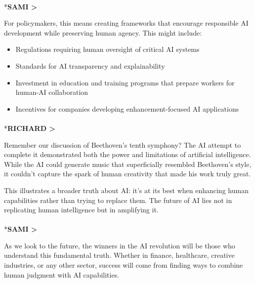 \documentclass[
  Letterpaper,
]{scrbook}
\makeatletter
\let\oldparagraph\paragraph
\renewcommand{\paragraph}{
    \@ifstar
      \xxxParagraphStar
      \xxxParagraphNoStar
  }
\newcommand{\xxxParagraphStar}[1]{\oldparagraph*{#1}\mbox{}}
\newcommand{\xxxParagraphNoStar}[1]{\oldparagraph{#1}\mbox{}}
\providecommand{\tightlist}{%
  \setlength{\itemsep}{0pt}\setlength{\parskip}{0pt}}\usepackage{longtable,booktabs,array}
\makeatother
\begin{document}
\paragraph*{\texorpdfstring{\textbf{SAMI
\textgreater{}}}{SAMI \textgreater{}}}\label{sami-2}

For policymakers, this means creating frameworks that encourage
responsible AI development while preserving human agency. This might
include:

\begin{itemize}
\tightlist
\item
  Regulations requiring human oversight of critical AI systems
\item
  Standards for AI transparency and explainability
\item
  Investment in education and training programs that prepare workers for
  human-AI collaboration
\item
  Incentives for companies developing enhancement-focused AI
  applications
\end{itemize}

\paragraph*{\texorpdfstring{\textbf{RICHARD
\textgreater{}}}{RICHARD \textgreater{}}}\label{richard-3}

Remember our discussion of Beethoven's tenth symphony? The AI attempt to
complete it demonstrated both the power and limitations of artificial
intelligence. While the AI could generate music that superficially
resembled Beethoven's style, it couldn't capture the spark of human
creativity that made his work truly great.

This illustrates a broader truth about AI: it's at its best when
enhancing human capabilities rather than trying to replace them. The
future of AI lies not in replicating human intelligence but in
amplifying it.

\paragraph*{\texorpdfstring{\textbf{SAMI
\textgreater{}}}{SAMI \textgreater{}}}\label{sami-3}

As we look to the future, the winners in the AI revolution will be those
who understand this fundamental truth. Whether in finance, healthcare,
creative industries, or any other sector, success will come from finding
ways to combine human judgment with AI capabilities.
\end{document}
